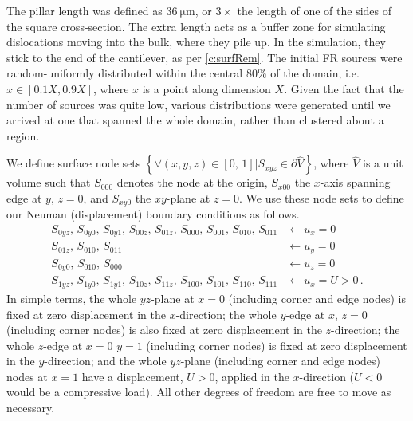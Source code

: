 The pillar length was defined as $\SI{36}{\micro\metre}$, or $3\times$ the length of one of the sides of the square cross-section. The extra length acts as a buffer zone for simulating dislocations moving into the bulk, where they pile up. In the simulation, they stick to the end of the cantilever, as per \cref{c:surfRem}. The initial FR sources were random-uniformly distributed within the central $80\%$ of the domain, i.e. $x \in [0.1X, 0.9X]$, where $x$ is a point along dimension $X$. Given the fact that the number of sources was quite low, various distributions were generated until we arrived at one that spanned the whole domain, rather than clustered about a region.

We define surface node sets $\left\{\forall (x, y, z) \in [0,\, 1] \vert S_{xyz} \in \partial \hat{V}\right\}$, where $\hat{V}$ is a unit volume such that $S_{000}$ denotes the node at the origin, $S_{x00}$ the $x$-axis spanning edge at $y,\, z=0$, and $S_{xy0}$ the $xy$-plane at $z=0$. We use these node sets to define our Neuman (displacement) boundary conditions as follows.
\begin{subequations}
    \begin{align}
        S_{0yz},\, S_{0y0},\, S_{0y1},\, S_{00z},\, S_{01z},\, S_{000},\, S_{001},\, S_{010},\, S_{011} & \gets u_x = 0        \\
        S_{01z},\, S_{010},\, S_{011}                                                                   & \gets u_y = 0        \\
        S_{0y0},\, S_{010},\, S_{000}                                                                   & \gets u_z = 0        \\
        S_{1yz},\, S_{1y0},\, S_{1y1},\, S_{10z},\, S_{11z},\, S_{100},\, S_{101},\, S_{110},\, S_{111} & \gets u_x = U > 0\,.
    \end{align}
\end{subequations}
In simple terms, the whole $yz$-plane at $x=0$ (including corner and edge nodes) is fixed at zero displacement in the $x$-direction; the whole $y$-edge at $x,\,z=0$ (including corner nodes) is also fixed at zero displacement in the $z$-direction; the whole $z$-edge at $x = 0\,\, y = 1$ (including corner nodes) is fixed at zero displacement in the $y$-direction; and the whole $yz$-plane (including corner and edge nodes) nodes at $x=1$ have a displacement, $U > 0$, applied in the $x$-direction ($U < 0$ would be a compressive load). All other degrees of freedom are free to move as necessary.

